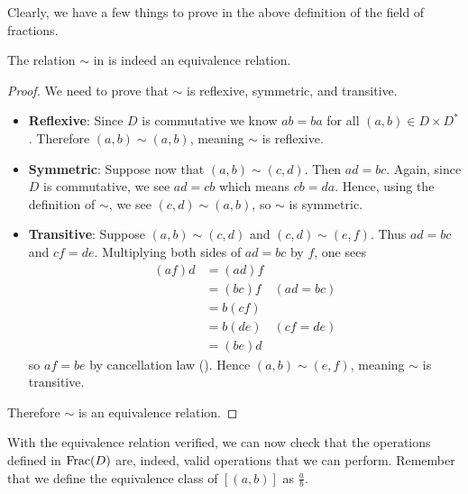 Clearly, we have a few things to prove in the above definition of the field of fractions.

\begin{proposition}
    The relation $\sim$ in  is indeed an equivalence relation.
\end{proposition}
\begin{proof}
    We need to prove that $\sim$ is reflexive, symmetric, and transitive.
    \begin{itemize}
        \item \textbf{Reflexive}: Since $D$ is commutative we know $ab = ba$ for all $(a,b) \in D \times D^\ast$. Therefore $(a, b) \mathrel{\sim} (a, b)$, meaning $\sim$ is reflexive.
        
        \item \textbf{Symmetric}: Suppose now that $(a,b)\mathrel{\sim}(c,d)$. Then $ad = bc$. Again, since $D$ is commutative, we see $ad = cb$ which means $cb = da$. Hence, using the definition of $\sim$, we see $(c,d)\mathrel{\sim}(a,b)$, so $\sim$ is symmetric.
        
        \item \textbf{Transitive}: Suppose $(a,b)\mathrel{\sim}(c,d)$ and $(c,d)\mathrel{\sim}(e,f)$. Thus $ad = bc$ and $cf = de$. Multiplying both sides of $ad = bc$ by $f$, one sees
        \begin{align*}
            (af)d &= (ad)f\\
            &= (bc)f & (ad = bc)\\
            &= b(cf)\\
            &= b(de) & (cf = de)\\
            &= (be)d
        \end{align*}
        so $af = be$ by cancellation law (). Hence $(a,b)\mathrel{\sim}(e,f)$, meaning $\sim$ is transitive.
    \end{itemize}
    Therefore $\sim$ is an equivalence relation.
\end{proof}

With the equivalence relation verified, we can now check that the operations defined in $\mathrm{Frac}(D)$ are, indeed, valid operations that we can perform. Remember that we define the equivalence class of $[(a, b)]$ as $\frac ab$.

